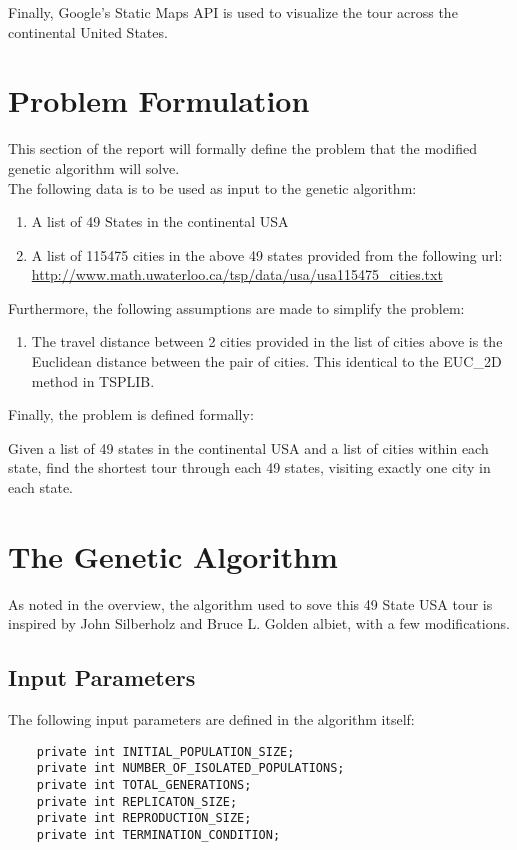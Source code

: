 \documentclass[12pt]{article}
\begin{document}
Finally, Google's Static Maps API is used to visualize the tour across the continental United States.

\section{Problem Formulation}

This section of the report will formally define the problem that the modified genetic algorithm will solve.\\

The following data is to be used as input to the genetic algorithm:
\begin{enumerate}
  \item A list of 49 States in the continental USA
  \item A list of 115475 cities in the above 49 states provided from the following url:\\ \url{http://www.math.uwaterloo.ca/tsp/data/usa/usa115475_cities.txt}
\end{enumerate}

Furthermore, the following assumptions are made to simplify the problem:
\begin{enumerate}
  \item The travel distance between 2 cities provided in the list of cities above is the Euclidean distance between the pair of cities. This identical to the EUC\_2D method in TSPLIB.
\end{enumerate}

Finally, the problem is defined formally:
\begin{tcolorbox}
  Given a list of 49 states in the continental USA and a list of cities within each state, find the shortest tour through each 49 states, visiting exactly one city in each state.
\end{tcolorbox}

\section{The Genetic Algorithm}

As noted in the overview, the algorithm used to sove this 49 State USA tour is inspired by John Silberholz and Bruce L. Golden albiet, with a few modifications. 

\subsection{Input Parameters}
  The following input parameters are defined in the algorithm itself:
  \begin{verbatim}
    private int INITIAL_POPULATION_SIZE;
    private int NUMBER_OF_ISOLATED_POPULATIONS;
    private int TOTAL_GENERATIONS;
    private int REPLICATON_SIZE;
    private int REPRODUCTION_SIZE;
    private int TERMINATION_CONDITION;
  \end{verbatim}
\end{document}
